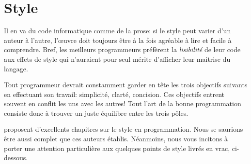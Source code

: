 \section{Style}
\label{sec:collaboration:style}

Il en va du code informatique comme de la prose: si le style peut
varier d'un auteur à l'autre, l'œuvre doit toujours être à la fois
agréable à lire et facile à comprendre. Bref, les meilleurs
programmeurs préfèrent la \emph{lisibilité} de leur code aux effets de
style qui n'auraient pour seul mérite d'afficher leur maitrise du
langage.

Tout programmeur devrait constamment garder en tête les trois
objectifs suivants en effectuant son travail: simplicité, clarté,
concision. Ces objectifs entrent souvent en conflit les uns avec les
autres! Tout l'art de la bonne programmation consiste donc à trouver
un juste équilibre entre les trois pôles.

\citet{Kernighan:practice:1999,Oualline:C:1997,Kernighan:style:1978}
proposent d'excellents chapitres sur le style en programmation. Nous
se saurions être aussi complet que ces auteurs établis. Néanmoins,
nous vous incitons à porter une attention particulière aux quelques
points de style livrés en vrac, ci-dessous.

